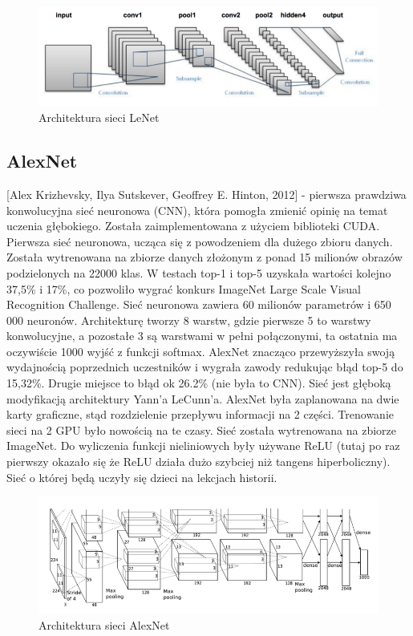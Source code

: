 \documentclass[12pt,a4paper,twoside,titlepage,openright]{book}
\begin{document}
\begin{figure}[h]
	\centering
			\includegraphics[resolution=100, scale=0.6]{LeNet.png}
		\caption{Architektura sieci LeNet}
\end{figure}

\subsection{AlexNet}
 [Alex Krizhevsky, Ilya Sutskever, Geoffrey E. Hinton, 2012] - pierwsza prawdziwa konwolucyjna sieć neuronowa (CNN), która pomogła zmienić opinię na temat uczenia głębokiego. Została zaimplementowana z użyciem biblioteki CUDA. Pierwsza sieć neuronowa, ucząca się z powodzeniem dla dużego zbioru danych.
 Została wytrenowana na zbiorze danych złożonym z ponad 15 milionów obrazów podzielonych na 22000 klas. 
 W testach top-1 i top-5 uzyskała wartości kolejno 37,5\% i 17\%, co pozwoliło wygrać konkurs ImageNet Large Scale Visual Recognition Challenge. 
 Sieć neuronowa zawiera 60 milionów parametrów i 650 000 neuronów. Architekturę tworzy 8 warstw, gdzie pierwsze 5 to warstwy konwolucyjne, a pozostałe 3 są warstwami w pełni połączonymi, ta ostatnia ma oczywiście 1000 wyjść z funkcji softmax. AlexNet znacząco przewyższyła swoją wydajnością poprzednich uczestników i wygrała zawody redukując błąd top-5 do 15,32\%. Drugie miejsce to błąd ok 26.2\% (nie była to CNN). Sieć jest głęboką modyfikacją architektury Yann’a LeCunn’a. AlexNet była zaplanowana na dwie karty graficzne, stąd rozdzielenie przepływu informacji na 2 części. Trenowanie sieci na 2 GPU było nowością na te czasy. Sieć została wytrenowana na zbiorze ImageNet. Do wyliczenia funkcji nieliniowych były używane ReLU (tutaj po raz pierwszy okazało się że ReLU działa dużo szybciej niż tangens hiperboliczny). Sieć o której będą uczyły się dzieci na lekcjach historii. \cite{NIPS2012_4824}

\begin{figure}[h]
	\centering
			\includegraphics[resolution=100, scale=0.7]{AlexNet.png}
		\caption{Architektura sieci AlexNet}
\end{figure}
\end{document}
